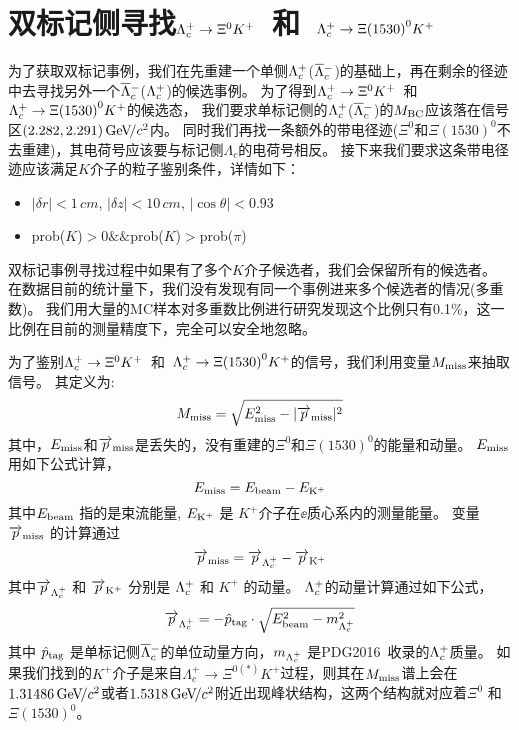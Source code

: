 \section{双标记侧寻找$\Lambda_{c}^{+}\rightarrow \Xi^{0}K^{+}$~和~$\Lambda_{c}^{+}\rightarrow \Xi{(1530)}^{0}K^{+}$}
为了获取双标记事例，我们在先重建一个单侧$\Lambda_{c}^{+}$($\overline{\Lambda}{}_{c}^{-}$)的基础上，再在剩余的径迹中去寻找另外一个$\overline{\Lambda}{}_{c}^{-}$($\Lambda_{c}^{+}$)的候选事例。
为了得到$\Lambda_{c}^{+}\rightarrow \Xi^{0}K^{+}$~和~$\Lambda_{c}^{+}\rightarrow \Xi{(1530)}^{0}K^{+}$的候选态，
我们要求单标记侧的$\Lambda_{c}^{+}$($\overline{\Lambda}{}_{c}^{-}$)的$M_{\rm BC}$应该落在信号区$(2.282,2.291){\mathrm{\,Ge\kern -0.1em V\!/}c^2}$内。
同时我们再找一条额外的带电径迹($\Xi^{0}$和$\Xi{(1530)}^{0}$不去重建)，其电荷号应该要与标记侧$\Lambda_c$的电荷号相反。
接下来我们要求这条带电径迹应该满足$K$介子的粒子鉴别条件，详情如下：
 \begin{itemize}
 \item $|\delta r|<1\,\unit{cm}$, $|\delta z|<10\,\unit{cm}$, $|\cos\theta|<0.93$
 \item  prob($K$)$>$0$\mathcal{\&\&}$prob($K$)$>$prob($\pi$)
 \end{itemize}
双标记事例寻找过程中如果有了多个$K$介子候选者，我们会保留所有的候选者。
在数据目前的统计量下，我们没有发现有同一个事例进来多个候选者的情况(多重数)。
我们用大量的MC样本对多重数比例进行研究发现这个比例只有0.1\%，这一比例在目前的测量精度下，完全可以安全地忽略。

为了鉴别$\Lambda_{c}^{+}\rightarrow \Xi^{0}K^{+}$~和~$\Lambda_{c}^{+}\rightarrow \Xi{(1530)}^{0}K^{+}$的信号，我们利用变量$M_{\rm miss}$来抽取信号。
其定义为:
\begin{equation}
M_{\rm miss} = \sqrt{E_{\rm miss}^{2}-|\overrightarrow{p}_{\rm miss}|^{2}}
\end{equation}
其中，$E_{\rm miss}$和$\overrightarrow{p}_{\rm miss}$是丢失的，没有重建的$\Xi^{0}$和$\Xi{(1530)}^{0}$的能量和动量。
$E_{\rm miss}$用如下公式计算，
\begin{equation}
E_{\rm miss} = E_{\rm beam}-E_{\rm K^{+}}
\end{equation}
其中$E_{\rm beam}$ 指的是束流能量, $E_{\rm K^{+}}$ 是 $K^{+}$介子在$\ee$质心系内的测量能量。
变量$\overrightarrow{p}_{\rm miss}$ 的计算通过
\begin{equation}
\overrightarrow{p}_{\rm miss} = \overrightarrow{p}_{\Lambda_{c}^{+}} - \overrightarrow{p}_{\rm K^{+}}
\end{equation}
其中$\overrightarrow{p}_{\Lambda_{c}^{+}}$ 和 $\overrightarrow{p}_{\rm K^{+}}$ 分别是 $\Lambda_{c}^{+}$ 和 $K^{+}$ 的动量。
$\Lambda_{c}^{+}$的动量计算通过如下公式，
\begin{equation}
\overrightarrow{p}_{\Lambda_{c}^{+}}  = -\hat{p}_{\rm tag}\cdot\sqrt{E_{\rm beam}^{2}-m_{\Lambda_{c}^{+}}^{2}}
\end{equation}
其中 $\hat{p}_{\rm tag}$ 是单标记侧$\overline{\Lambda}{}_{c}^{-}$的单位动量方向，$m_{\Lambda_{c}^{+}}$ 是PDG2016~\cite{PDG2017}收录的$\Lambda_{c}^{+}$质量。
如果我们找到的$K^{+}$介子是来自$\Lambda_{c}^{+}\to \Xi^{0(*)}K^{+}$过程，则其在$M_{\rm miss}$谱上会在$1.31486{\mathrm{\,Ge\kern -0.1em V\!/}c^2}$或者$1.5318{\mathrm{\,Ge\kern -0.1em V\!/}c^2}$附近出现峰状结构，这两个结构就对应着$\Xi^{0}$ 和 $\Xi{(1530)}^{0}$。

